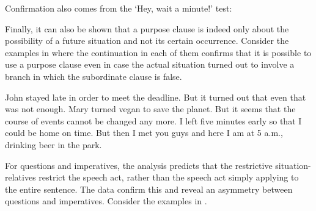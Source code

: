 \documentclass[output=paper]{langscibook}
\begin{document}

Confirmation also comes from the `Hey, wait a minute!' test:

\ea\label{ex:PresupTest6}
\ea\label{ex:PresupTest6-a}
        \begin{xlist}
        \end{xlist}
\ex\label{ex:PresupTest6-b}
        \begin{xlist}
        \end{xlist}
\ex\label{ex:PresupTest6-c}
        \begin{xlist}
        \end{xlist}
\z\z


\noindent Finally, it can also be shown that a purpose clause is indeed only about the possibility of a future situation and not its certain occurrence. Consider the examples in  where the continuation in each of them confirms that it is possible to use a purpose clause even in case the actual situation turned out to involve a branch in which the subordinate clause is false.

\ea\label{ex:PossTest}
\ea John stayed late in order to meet the deadline. But it turned out that even that was not enough.
\ex Mary turned vegan to save the planet. But it seems that the course of events cannot be changed any more.
\ex I left five minutes early so that I could be home on time. But then I met you guys and here I am at 5 a.m., drinking beer in the park.
\z\z

\noindent For questions and imperatives, the analysis predicts that the restrictive situation-relatives restrict the speech act, rather than the speech act simply applying to the entire sentence. The data confirm this and reveal an asymmetry between questions and imperatives. Consider the examples in .

\ea\label{ex:SpAct}
\label{ex:SpAct-a}
\label{ex:SpAct-b}
\label{ex:SpAct-c}
\label{ex:SpAct-d}
\z\z
\end{document}
